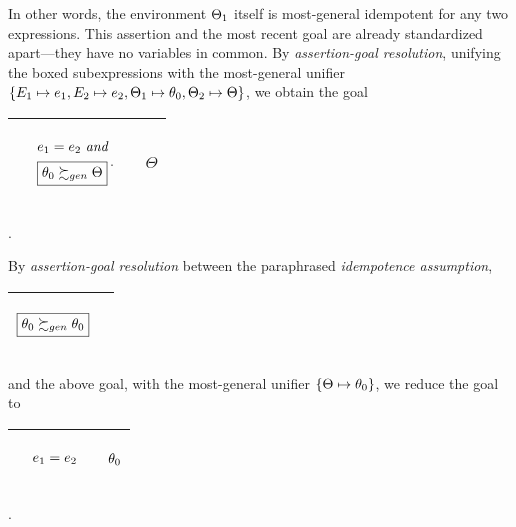 \documentclass[runningheads]{llncs}
\DeclareMathOperator{\uand}{\emph{and}\,}
\begin{document}
In other words, the environment $\Theta_{1}$ itself is most-general idempotent for any two expressions.  This assertion and the most recent goal are already standardized apart---they have no variables in common.  By \emph{assertion-goal resolution}, unifying the boxed subexpressions with the most-general unifier 
$\{{E}_{1} \mapsto {e}_{1}, {E}_{2} \mapsto {e}_{2}, \Theta_{1} \mapsto \theta_{0}, \Theta_{2} \mapsto \Theta\}$,
we obtain the goal
\begin{center}
\begin{tabular}{T}
 \hline 
  & 
  \begin{center}
${\begin{aligned} 
&\begin{aligned}
&\e{1} = \e{2}  \, \uand 
 \\
 \,\, & \boxed{\thet{0} \moregen \Theta} 
\end{aligned}.\end{aligned}}$\hspace{1cm} 
\end{center} & \begin{center}$\Theta$ \end{center} \\
\hline
\end{tabular}.
\end{center}
By \emph{assertion-goal resolution} between the paraphrased \emph{idempotence assumption},
\begin{center}
\begin{tabular}{T}
 \hline 
 \begin{center}
 \vspace{-.25cm}
$\begin{aligned} \boxed{\theta_{0} \succsim_{gen} \theta_{0}}\end{aligned}$
\end{center}
  & 
  &  \\ \hline
\end{tabular}
\end{center}
and the above goal, with the most-general unifier $\{\Theta \mapsto \theta_{0}\}$, we reduce the goal to
\begin{center}
\begin{tabular}{T}
 \hline 
  & 
  \begin{center}
${\begin{aligned} 
&\begin{aligned}
e_{1} = e_{2}
\end{aligned}\end{aligned}}$\hspace{1cm} 
\end{center} & \begin{center}$\theta_{0}$ \end{center} \\
\hline
\end{tabular}.
\end{center}
\end{document}
